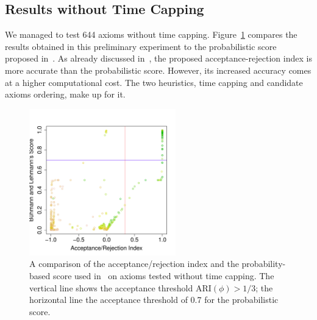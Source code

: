 \documentclass[conference]{IEEEtran}
\begin{document}
\subsection{Results without Time Capping}
\label{results-no-timeout}

We managed to test 644 axioms without time capping.
Figure~\ref{fig:ARI-BLS} compares the results obtained in this preliminary experiment
to the probabilistic score proposed in~\cite{BuehmannLehmann2012}.
As already discussed in~\cite{TettamanziFaronZuckerGandon2014ekaw}, the proposed
acceptance-rejection index is more accurate than the probabilistic score.
However, its increased accuracy comes at a higher computational cost.
The two heuristics, time capping and candidate axioms ordering, make up for it.


\begin{figure}[t]
\begin{center}
    \includegraphics[height=2.5in]{ARI-BLS}
\end{center}
\caption{A comparison of the acceptance/rejection index and the probability-based
  score used in~\cite{BuehmannLehmann2012} on axioms tested without time capping.
  The vertical line shows the acceptance threshold $\mathrm{ARI}(\phi)>1/3$;
  the horizontal line the acceptance threshold of 0.7 for the probabilistic score.}
\label{fig:ARI-BLS}
\end{figure}
\end{document}
